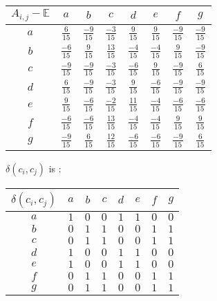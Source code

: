 \documentclass[a4paper, 12pt, twocolumn]{article}
\begin{document}
\begin{center}
       \begin{tabular}{c|ccccccc} 
              $ A_{i, j} - \mathbb{E} $ & $ a $ & $ b $ & $ c $ & $ d $ & $ e $ & $ f $ & $ g $ \\
              \hline
              $ a $ & $ \frac{6}{15}  $ & $ \frac{-9}{15} $ & $ \frac{-3}{15} $ & $ \frac{9}{15}  $ & $ \frac{9}{15}  $ & $ \frac{-9}{15} $ & $ \frac{-9}{15} $ \\
              $ b $ & $ \frac{-6}{15} $ & $ \frac{9}{15}  $ & $ \frac{13}{15} $ & $ \frac{-4}{15} $ & $ \frac{-4}{15} $ & $ \frac{9}{15}  $ & $ \frac{-9}{15} $ \\
              $ c $ & $ \frac{-9}{15} $ & $ \frac{-9}{15} $ & $ \frac{-3}{15} $ & $ \frac{-6}{15} $ & $ \frac{9}{15}  $ & $ \frac{-9}{15} $ & $ \frac{6}{15}  $ \\
              $ d $ & $ \frac{6}{15}  $ & $ \frac{-9}{15} $ & $ \frac{-3}{15} $ & $ \frac{9}{15}  $ & $ \frac{-6}{15} $ & $ \frac{-9}{15} $ & $ \frac{-9}{15} $ \\
              $ e $ & $ \frac{9}{15}  $ & $ \frac{-6}{15} $ & $ \frac{-2}{15} $ & $ \frac{11}{15} $ & $ \frac{-4}{15} $ & $ \frac{-6}{15} $ & $ \frac{-6}{15} $ \\
              $ f $ & $ \frac{-6}{15} $ & $ \frac{-6}{15} $ & $ \frac{13}{15} $ & $ \frac{-4}{15} $ & $ \frac{-4}{15} $ & $ \frac{9}{15}  $ & $ \frac{9}{15}  $ \\
              $ g $ & $ \frac{-9}{15} $ & $ \frac{6}{15}  $ & $ \frac{12}{15} $ & $ \frac{-6}{15} $ & $ \frac{-6}{15} $ & $ \frac{-9}{15} $ & $ \frac{6}{15}  $ \\
       \end{tabular}
\end{center}

$ \delta(c_{i}, c_{j}) $ is :

\begin{center}
       \begin{tabular}{c|ccccccc} 
              $ \delta(c_{i}, c_{j}) $ & $ a $ & $ b $ & $ c $ & $ d $ & $ e $ & $ f $ & $ g $ \\
              \hline
              $ a $ & $ 1 $ & $ 0 $ & $ 0 $ & $ 1 $ & $ 1 $ & $ 0 $ & $ 0 $ \\
              $ b $ & $ 0 $ & $ 1 $ & $ 1 $ & $ 0 $ & $ 0 $ & $ 1 $ & $ 1 $ \\
              $ c $ & $ 0 $ & $ 1 $ & $ 1 $ & $ 0 $ & $ 0 $ & $ 1 $ & $ 1 $ \\
              $ d $ & $ 1 $ & $ 0 $ & $ 0 $ & $ 1 $ & $ 1 $ & $ 0 $ & $ 0 $ \\
              $ e $ & $ 1 $ & $ 0 $ & $ 0 $ & $ 1 $ & $ 1 $ & $ 0 $ & $ 0 $ \\
              $ f $ & $ 0 $ & $ 1 $ & $ 1 $ & $ 0 $ & $ 0 $ & $ 1 $ & $ 1 $ \\
              $ g $ & $ 0 $ & $ 1 $ & $ 1 $ & $ 0 $ & $ 0 $ & $ 1 $ & $ 1 $ \\
       \end{tabular}
\end{center}
\end{document}
